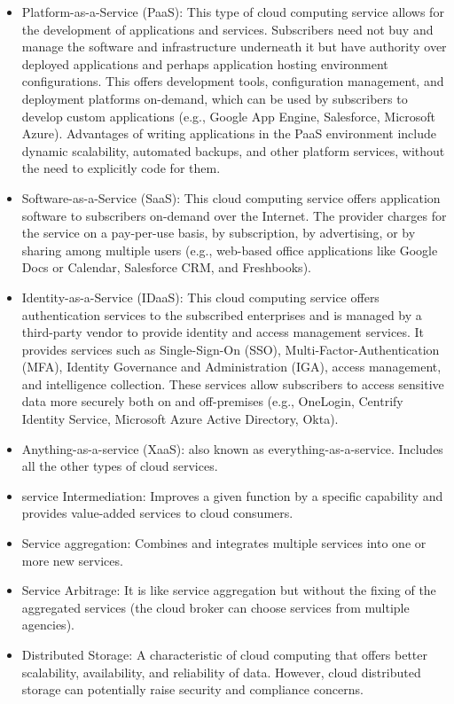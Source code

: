 \begin{itemize}
    \item Platform-as-a-Service (PaaS): This type of cloud computing service allows for the development of applications and services. Subscribers need not buy and manage the software and infrastructure underneath it but have authority over deployed applications and perhaps application hosting environment configurations. This offers development tools, configuration management, and deployment platforms on-demand, which can be used by subscribers to develop custom applications (e.g., Google App Engine, Salesforce, Microsoft Azure). Advantages of writing applications in the PaaS environment include dynamic scalability, automated backups, and other platform services, without the need to explicitly code for them.
    \item Software-as-a-Service (SaaS): This cloud computing service offers application software to subscribers on-demand over the Internet. The provider charges for the service on a pay-per-use basis, by subscription, by advertising, or by sharing among multiple users (e.g., web-based office applications like Google Docs or Calendar, Salesforce CRM, and Freshbooks).
    \item Identity-as-a-Service (IDaaS): This cloud computing service offers authentication services to the subscribed enterprises and is managed by a third-party vendor to provide identity and access management services. It provides services such as Single-Sign-On (SSO), Multi-Factor-Authentication (MFA), Identity Governance and Administration (IGA), access management, and intelligence collection. These services allow subscribers to access sensitive data more securely both on and off-premises (e.g., OneLogin, Centrify Identity Service, Microsoft Azure Active Directory, Okta).
    \item Anything-as-a-service (XaaS): also known as everything-as-a-service. Includes all the other types of cloud services.
    \item service Intermediation: Improves a given function by a specific capability and provides value-added services to cloud consumers.
    \item Service aggregation: Combines and integrates multiple services into one or more new services.
    \item Service Arbitrage: It is like service aggregation but without the fixing of the aggregated services (the cloud broker can choose services from multiple agencies).
    \item Distributed Storage: A characteristic of cloud computing that offers better scalability, availability, and reliability of data. However, cloud distributed storage can potentially raise security and compliance concerns.

\end{itemize}
